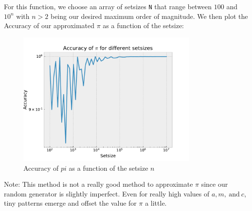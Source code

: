 \documentclass{article}
\begin{document}
For this function, we choose an array of setsizes \texttt{N} that range between
\( 100 \) and \( 10^n \) with \( n > 2 \) being our desired maximum order of
magnitude. We then plot the Accuracy of our approximated \( \pi \) as a
function of the setsize:
\begin{figure}[H]
    \centering
    \includegraphics[width=9cm]{Fig3-2.pdf}
    \caption{Accuracy of $pi$ as a function of the setsize $n$}
\end{figure}
Note: This method is not a really good method to approximate \( \pi \) since
our random generator is slightly imperfect. Even for really high values of
\( a, m, \ \text{and} \ c \), tiny patterns emerge and offset the value for
\( \pi \) a little.
\end{document}
